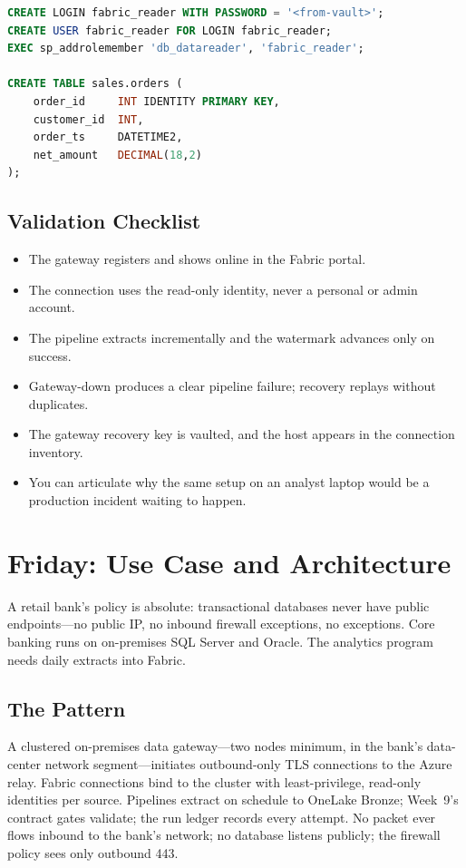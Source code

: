 \begin{lstlisting}[language=SQL,caption={Mock source setup for the Week 11 lab.},label={lst:chapter11-lab-setup}]
CREATE LOGIN fabric_reader WITH PASSWORD = '<from-vault>';
CREATE USER fabric_reader FOR LOGIN fabric_reader;
EXEC sp_addrolemember 'db_datareader', 'fabric_reader';

CREATE TABLE sales.orders (
    order_id     INT IDENTITY PRIMARY KEY,
    customer_id  INT,
    order_ts     DATETIME2,
    net_amount   DECIMAL(18,2)
);
\end{lstlisting}

\subsection{Validation Checklist}
\begin{itemize}
    \item The gateway registers and shows online in the Fabric portal.
    \item The connection uses the read-only identity, never a personal or admin account.
    \item The pipeline extracts incrementally and the watermark advances only on success.
    \item Gateway-down produces a clear pipeline failure; recovery replays without duplicates.
    \item The gateway recovery key is vaulted, and the host appears in the connection inventory.
    \item You can articulate why the same setup on an analyst laptop would be a production incident waiting to happen.
\end{itemize}

\section{Friday: Use Case and Architecture}
A retail bank's policy is absolute: transactional databases never have public endpoints---no public IP, no inbound firewall exceptions, no exceptions. Core banking runs on on-premises SQL Server and Oracle. The analytics program needs daily extracts into Fabric.

\subsection{The Pattern}
A clustered on-premises data gateway---two nodes minimum, in the bank's data-center network segment---initiates outbound-only TLS connections to the Azure relay. Fabric connections bind to the cluster with least-privilege, read-only identities per source. Pipelines extract on schedule to OneLake Bronze; Week~9's contract gates validate; the run ledger records every attempt. No packet ever flows inbound to the bank's network; no database listens publicly; the firewall policy sees only outbound 443.


